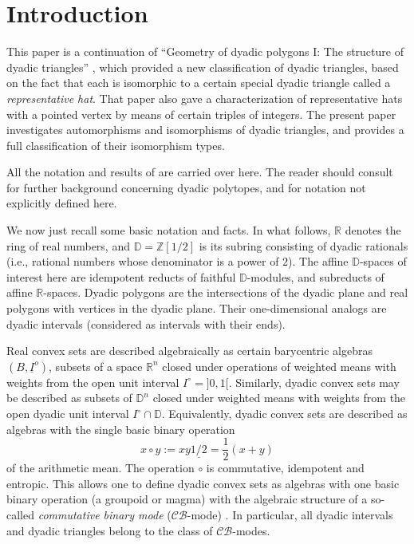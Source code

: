 \documentclass[12pt]{amsart}
\def\mbR{\mathbb{R}}
\def\mbZ{\mathbb{Z}}
\def\mbD{\mathbb{D}}
\newcommand{\mc}{\mathcal}
\newcommand{\uIo}{\underline{I}^{o}}
\theoremstyle{plain}
\theoremstyle{definition}
\numberwithin{equation}{section}
\begin{document}
\section{Introduction}

This paper is a continuation of ``Geometry of dyadic polygons I: The structure of dyadic triangles'' \cite{MR25}, which provided a new classification of dyadic triangles, based on the fact that each is isomorphic to a certain special dyadic triangle called a \emph{representative hat}. That paper also gave a characterization of representative hats with a pointed vertex by means of certain triples of integers. The present paper investigates automorphisms and isomorphisms of dyadic triangles, and provides a full
classification of their isomorphism types.

All the notation and results of \cite{MR25} are carried over here. The reader should consult \cite{MR25} for further background concerning dyadic polytopes, and for notation not explicitly defined here.

We now just recall some basic notation and facts.
In what follows, $\mbR$ denotes the ring of real numbers, and $\mbD  = \mbZ[1/2]$ is its subring consisting of dyadic rationals (i.e., rational numbers whose denominator is a power of $2$). The affine $\mbD$-spaces of interest here are idempotent reducts of faithful $\mbD$-modules, and subreducts of affine $\mbR$-spaces. Dyadic polygons are the intersections of the dyadic
plane and real polygons with vertices in the dyadic plane. Their one-dimensional analogs are
dyadic intervals (considered as intervals with their ends).

Real convex sets are described algebraically as certain barycentric algebras $(B,\uIo)$, subsets of a space $\mbR^n$ closed under operations of weighted means with weights from the open unit interval $I^{\circ} = ]0,1[$. Similarly, dyadic convex sets may be described as subsets of $\mbD^n$ closed under weighted means with weights from the open dyadic unit interval $I^{\circ} \cap \mbD$. Equivalently, dyadic convex sets are described as algebras with the single basic binary operation 
\[
x \circ y := xy \underline{1/2} = \frac{1}{2}(x + y)
\]
of the arithmetic mean.
The operation $\circ$ is commutative, idempotent and entropic. This allows one to define dyadic convex sets as algebras with one basic binary operation (a groupoid or magma) with the algebraic structure of a so-called \emph{commutative binary mode} ($\mc{CB}$-mode) \cite{RS02}. In particular, all dyadic intervals and dyadic triangles belong to the class of $\mc{CB}$-modes.
\end{document}
